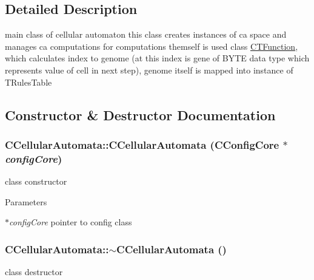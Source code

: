 \subsection{Detailed Description}
main class of cellular automaton this class creates instances of ca space and manages ca computations for computations themself is used class \hyperlink{classCTFunction}{CTFunction}, which calculates index to genome (at this index is gene of BYTE data type which represents value of cell in next step), genome itself is mapped into instance of TRulesTable 

\subsection{Constructor \& Destructor Documentation}
\hypertarget{classCCellularAutomata_a655184244b0dfb0fc760c8456c37544e}{
\subsubsection[{CCellularAutomata}]{\setlength{\rightskip}{0pt plus 5cm}CCellularAutomata::CCellularAutomata ({\bf CConfigCore} $\ast$ {\em configCore})}}
\label{classCCellularAutomata_a655184244b0dfb0fc760c8456c37544e}
class constructor


\begin{DoxyParams}{Parameters}
\item[{\em $\ast$configCore}]pointer to config class \end{DoxyParams}
\hypertarget{classCCellularAutomata_aea01c28581d9683737ce36f38c1ac7f5}{
\subsubsection[{$\sim$CCellularAutomata}]{\setlength{\rightskip}{0pt plus 5cm}CCellularAutomata::$\sim$CCellularAutomata ()}}
\label{classCCellularAutomata_aea01c28581d9683737ce36f38c1ac7f5}
class destructor 


